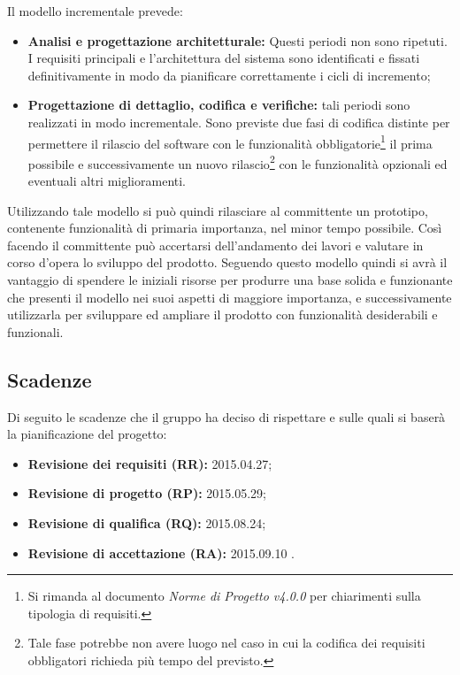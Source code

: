 Il modello incrementale prevede:
\begin{itemize}
	\item \textbf{Analisi e progettazione architetturale:} Questi periodi non sono ripetuti. I requisiti principali e l'architettura del sistema sono identificati e fissati definitivamente in modo da pianificare correttamente i cicli di incremento; 
	\item \textbf{Progettazione di dettaglio, codifica e verifiche:} tali periodi sono realizzati in modo incrementale. Sono previste due fasi di codifica distinte per permettere il rilascio del software con le funzionalità obbligatorie\footnote{Si rimanda al documento \textit{Norme di Progetto v4.0.0} per chiarimenti sulla tipologia di requisiti.} il prima possibile e successivamente un nuovo rilascio\footnote{Tale fase potrebbe non avere luogo nel caso in cui la codifica dei requisiti obbligatori richieda più tempo del previsto.} con le funzionalità opzionali ed eventuali altri miglioramenti.
\end{itemize}
Utilizzando tale modello si può quindi rilasciare al committente un \gls{prototipo}, contenente funzionalità di primaria importanza, nel minor tempo possibile. Così facendo il committente può accertarsi dell'andamento dei lavori e valutare in corso d'opera lo sviluppo del prodotto. Seguendo questo modello quindi si avrà il vantaggio di spendere le iniziali risorse per produrre una base solida e funzionante che presenti il modello nei suoi aspetti di maggiore importanza, e successivamente utilizzarla per sviluppare ed ampliare il prodotto con funzionalità desiderabili e funzionali.
 
\subsection{Scadenze}
Di seguito le scadenze che il gruppo \GRUPPO{} ha deciso di rispettare e sulle quali si baserà la pianificazione del progetto:
\begin{itemize}
	\item \textbf{Revisione dei requisiti (RR):} 2015.04.27;
	\item \textbf{Revisione di progetto (RP):} 2015.05.29;
	\item \textbf{Revisione di qualifica (RQ):} 2015.08.24;
	\item \textbf{Revisione di accettazione (RA):} 2015.09.10 .
\end{itemize}





